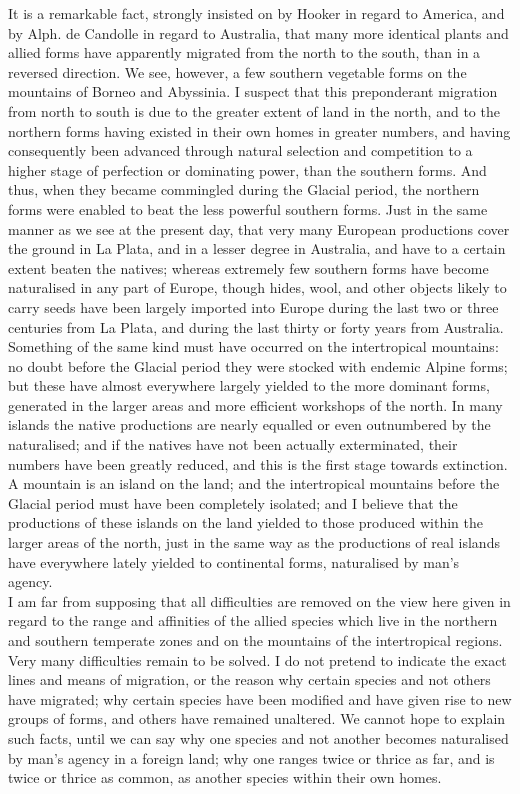 \indent It is a remarkable fact, strongly insisted on by Hooker in regard to America, and by Alph. de Candolle in regard to Australia, that many more identical plants and allied forms have apparently migrated from the north to the south, than in a reversed direction. We see, however, a few southern vegetable forms on the mountains of Borneo and Abyssinia.  I suspect that this preponderant migration from north to south is due to the greater extent of land in the north, and to the northern forms having existed in their own homes in greater numbers, and having consequently been advanced through natural selection and competition to a higher stage of perfection or dominating power, than the southern forms.  And thus, when they became commingled during the Glacial period, the northern forms were enabled to beat the less powerful southern forms. Just in the same manner as we see at the present day, that very many European productions cover the ground in La Plata, and in a lesser degree in Australia, and have to a certain extent beaten the natives; whereas extremely few southern forms have become naturalised in any part of Europe, though hides, wool, and other objects likely to carry seeds have been largely imported into Europe during the last two or three centuries from La Plata, and during the last thirty or forty years from Australia.  Something of the same kind must have occurred on the intertropical mountains: no doubt before the Glacial period they were stocked with endemic Alpine forms; but these have almost everywhere largely yielded to the more dominant forms, generated in the larger areas and more efficient workshops of the north. In many islands the native productions are nearly equalled or even outnumbered by the naturalised; and if the natives have not been actually exterminated, their numbers have been greatly reduced, and this is the first stage towards extinction. A mountain is an island on the land; and the intertropical mountains before the Glacial period must have been completely isolated; and I believe that the productions of these islands on the land yielded to those produced within the larger areas of the north, just in the same way as the productions of real islands have everywhere lately yielded to continental forms, naturalised by man's agency.~\\
\indent I am far from supposing that all difficulties are removed on the view here given in regard to the range and affinities of the allied species which live in the northern and southern temperate zones and on the mountains of the intertropical regions. Very many difficulties remain to be solved. I do not pretend to indicate the exact lines and means of migration, or the reason why certain species and not others have migrated; why certain species have been modified and have given rise to new groups of forms, and others have remained unaltered. We cannot hope to explain such facts, until we can say why one species and not another becomes naturalised by man's agency in a foreign land; why one ranges twice or thrice as far, and is twice or thrice as common, as another species within their own homes.~\\
